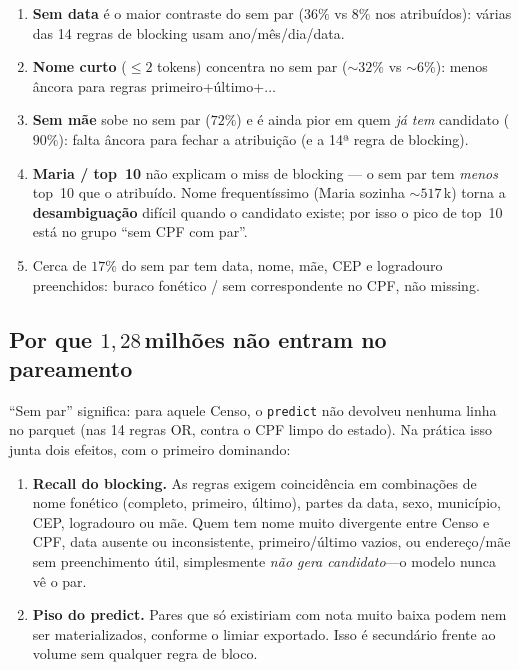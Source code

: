 \documentclass[11pt,a4paper]{article}
\begin{document}
\begin{enumerate}
  \item \textbf{Sem data} é o maior contraste do sem par ($36\%$ vs $8\%$ nos
        atribuídos): várias das 14 regras de blocking usam ano/mês/dia/data.
  \item \textbf{Nome curto} ($\le 2$ tokens) concentra no sem par
        ($\sim 32\%$ vs $\sim 6\%$): menos âncora para regras
        primeiro+último+$\ldots$
  \item \textbf{Sem mãe} sobe no sem par ($72\%$) e é ainda pior em quem
        \emph{já tem} candidato ($90\%$): falta âncora para fechar a
        atribuição (e a 14ª regra de blocking).
  \item \textbf{Maria / top~10} não explicam o miss de blocking --- o sem par
        tem \emph{menos} top~10 que o atribuído. Nome frequentíssimo
        (Maria sozinha $\sim 517$\,k) torna a \textbf{desambiguação} difícil
        quando o candidato existe; por isso o pico de top~10 está no grupo
        ``sem CPF com par''.
  \item Cerca de $17\%$ do sem par tem data, nome, mãe, CEP e logradouro
        preenchidos: buraco fonético / sem correspondente no CPF, não missing.
\end{enumerate}

\subsection{Por que $1{,}28$\,milhões não entram no pareamento}

``Sem par'' significa: para aquele Censo, o \texttt{predict} não devolveu
nenhuma linha no parquet (nas 14 regras OR, contra o CPF limpo do estado).
Na prática isso junta dois efeitos, com o primeiro dominando:

\begin{enumerate}
  \item \textbf{Recall do blocking.}
    As regras exigem coincidência em combinações de nome fonético (completo,
    primeiro, último), partes da data, sexo, município, CEP, logradouro ou
    mãe. Quem tem nome muito divergente entre Censo e CPF, data ausente ou
    inconsistente, primeiro/último vazios, ou endereço/mãe sem preenchimento
    útil, simplesmente \emph{não gera candidato}---o modelo nunca vê o par.
  \item \textbf{Piso do predict.}
    Pares que só existiriam com nota muito baixa podem nem ser materializados,
    conforme o limiar exportado. Isso é secundário frente ao volume sem
    qualquer regra de bloco.
\end{enumerate}
\end{document}
